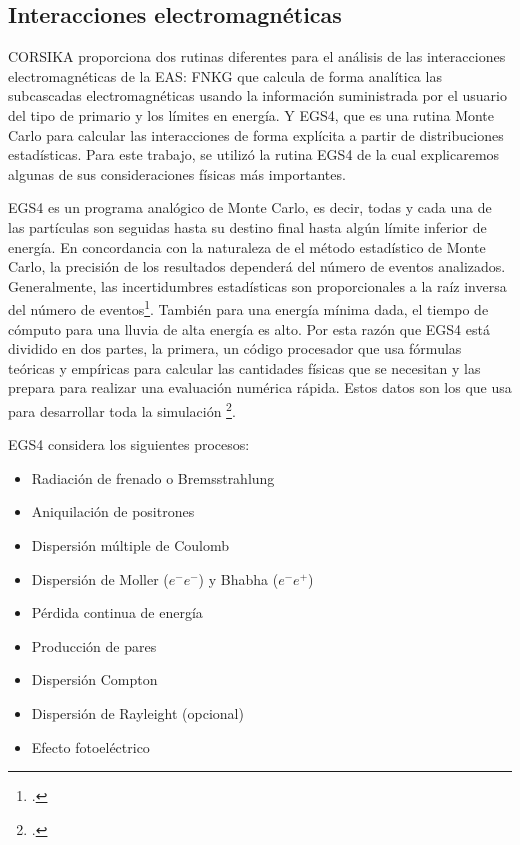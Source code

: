 \subsection{Interacciones electromagn\'eticas}

CORSIKA proporciona dos rutinas diferentes para el análisis de las interacciones electromagnéticas de la EAS: FNKG que calcula de forma analítica las subcascadas electromagnéticas usando la información suministrada por el usuario del tipo de primario y los límites en energía. Y EGS4, que es una rutina Monte Carlo para calcular las interacciones de forma explícita a partir de distribuciones estadísticas. Para este trabajo, se utilizó la rutina EGS4 de la cual explicaremos algunas de sus consideraciones físicas más importantes.

EGS4 es un programa analógico de Monte Carlo, es decir, todas y cada una de las partículas son seguidas hasta su destino final hasta algún límite inferior de energía. En concordancia con la naturaleza de el método estadístico de Monte Carlo, la precisión de los resultados dependerá del número de eventos analizados. Generalmente, las incertidumbres estadísticas son proporcionales a la raíz inversa del número de eventos\footcite{EGS4}. También para una energía mínima dada, el tiempo de cómputo para una lluvia de alta energía es alto. Por esta razón que EGS4 está dividido en dos partes, la primera, un código procesador que usa fórmulas teóricas y empíricas para calcular las cantidades físicas que se necesitan y las prepara para realizar una evaluación numérica rápida. Estos datos son los que usa para desarrollar toda la simulación \footcite[][2]{EGS4}.

EGS4 considera los siguientes procesos:

\begin{itemize}
    \item Radiación de frenado o Bremsstrahlung
    \item Aniquilación de positrones
    \item Dispersión múltiple de Coulomb
    \item Dispersión de Moller ($e^{-}e^{-}$) y Bhabha ($e^{-}e^{+}$)
    \item Pérdida continua de energía
    \item Producción de pares
    \item Dispersión Compton
    \item Dispersión de Rayleight (opcional)
    \item Efecto fotoeléctrico
\end{itemize}{}

